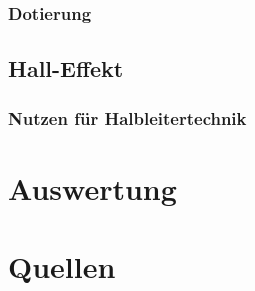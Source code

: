 \documentclass[numbers=noenddot,12pt,a4paper]{scrartcl}
\begin{document}
\subsubsection{Dotierung}
\subsection{Hall-Effekt}
\subsubsection{Nutzen für Halbleitertechnik}
\section{Auswertung}
\section{Quellen}
\end{document}
